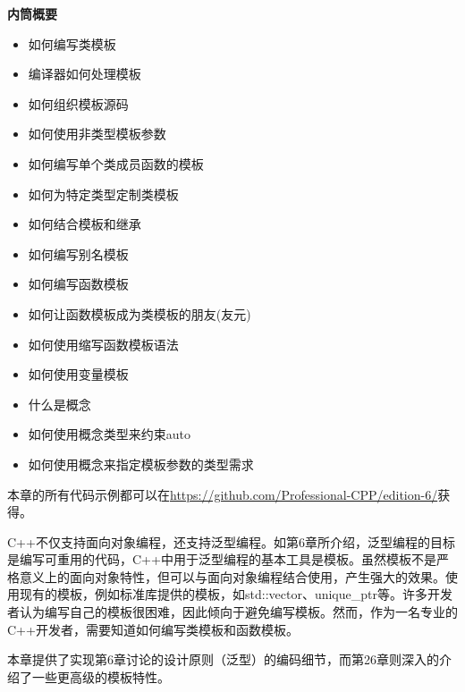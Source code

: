 \noindent
\textbf{内筒概要}

\begin{itemize}
\item
如何编写类模板

\item
编译器如何处理模板

\item
如何组织模板源码

\item
如何使用非类型模板参数

\item
如何编写单个类成员函数的模板

\item
如何为特定类型定制类模板

\item
如何结合模板和继承

\item
如何编写别名模板

\item
如何编写函数模板

\item
如何让函数模板成为类模板的朋友(友元)

\item
如何使用缩写函数模板语法

\item
如何使用变量模板

\item
什么是概念

\item
如何使用概念类型来约束auto

\item
如何使用概念来指定模板参数的类型需求
\end{itemize}

本章的所有代码示例都可以在\url{https://github.com/Professional-CPP/edition-6/}获得。

C++不仅支持面向对象编程，还支持泛型编程。如第6章所介绍，泛型编程的目标是编写可重用的代码，C++中用于泛型编程的基本工具是模板。虽然模板不是严格意义上的面向对象特性，但可以与面向对象编程结合使用，产生强大的效果。使用现有的模板，例如标准库提供的模板，如std::vector、unique\_ptr等。许多开发者认为编写自己的模板很困难，因此倾向于避免编写模板。然而，作为一名专业的C++开发者，需要知道如何编写类模板和函数模板。

本章提供了实现第6章讨论的设计原则（泛型）的编码细节，而第26章则深入的介绍了一些更高级的模板特性。



















